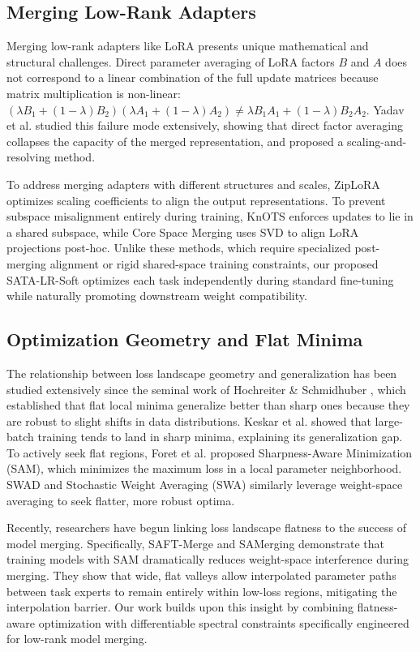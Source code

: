 \documentclass{article}
\begin{document}
\subsection{Merging Low-Rank Adapters}
Merging low-rank adapters like LoRA presents unique mathematical and structural challenges. Direct parameter averaging of LoRA factors $B$ and $A$ does not correspond to a linear combination of the full update matrices because matrix multiplication is non-linear: $(\lambda B_1 + (1-\lambda)B_2)(\lambda A_1 + (1-\lambda)A_2) \neq \lambda B_1 A_1 + (1-\lambda) B_2 A_2$. Yadav et al. \cite{yadav2024merging} studied this failure mode extensively, showing that direct factor averaging collapses the capacity of the merged representation, and proposed a scaling-and-resolving method. 

To address merging adapters with different structures and scales, ZipLoRA \cite{ziplora2023} optimizes scaling coefficients to align the output representations. To prevent subspace misalignment entirely during training, KnOTS \cite{stoica2025knots} enforces updates to lie in a shared subspace, while Core Space Merging \cite{panariello2025accurate} uses SVD to align LoRA projections post-hoc. Unlike these methods, which require specialized post-merging alignment or rigid shared-space training constraints, our proposed SATA-LR-Soft optimizes each task independently during standard fine-tuning while naturally promoting downstream weight compatibility.

\subsection{Optimization Geometry and Flat Minima}
The relationship between loss landscape geometry and generalization has been studied extensively since the seminal work of Hochreiter \& Schmidhuber \cite{local_minima_flatness}, which established that flat local minima generalize better than sharp ones because they are robust to slight shifts in data distributions. Keskar et al. \cite{generalization_flatness} showed that large-batch training tends to land in sharp minima, explaining its generalization gap. To actively seek flat regions, Foret et al. \cite{foret2020sharpness} proposed Sharpness-Aware Minimization (SAM), which minimizes the maximum loss in a local parameter neighborhood. SWAD \cite{cha2021swad} and Stochastic Weight Averaging (SWA) \cite{izmailov2018averaging} similarly leverage weight-space averaging to seek flatter, more robust optima. 

Recently, researchers have begun linking loss landscape flatness to the success of model merging. Specifically, SAFT-Merge \cite{lee2025mitigating} and SAMerging \cite{samerging2025} demonstrate that training models with SAM dramatically reduces weight-space interference during merging. They show that wide, flat valleys allow interpolated parameter paths between task experts to remain entirely within low-loss regions, mitigating the interpolation barrier. Our work builds upon this insight by combining flatness-aware optimization with differentiable spectral constraints specifically engineered for low-rank model merging.
\end{document}
